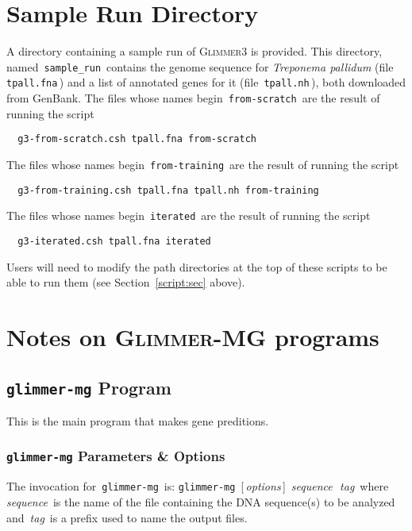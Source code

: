 \documentclass[fleqn,titlepage,11pt]{article}
\def\Desc#1{\,\mbox{\emph{#1}}\,}
\def\Gthree{\textsc{Glimmer3}}
\def\Gmg{\textsc{Glimmer-MG}}
\def\Pg#1{\texttt{#1}}
\begin{document}
\section{Sample Run Directory}

A directory containing a sample run of \Gthree{} is provided.
This directory, named \,\Pg{sample\_run}\, contains the genome sequence
for \emph{Treponema pallidum} (file \,\Pg{tpall.fna}\,)
and a list of annotated genes for it (file \,\Pg{tpall.nh}\,),
both downloaded from GenBank.
The files whose names begin \,\Pg{from-scratch}\, are the result of
running the script
\BSV
\begin{verbatim}
  g3-from-scratch.csh tpall.fna from-scratch
\end{verbatim}
\ESV
The files whose names begin \,\Pg{from-training}\, are the result of
running the script
\BSV
\begin{verbatim}
  g3-from-training.csh tpall.fna tpall.nh from-training
\end{verbatim}
\ESV
The files whose names begin \,\Pg{iterated}\, are the result of
running the script
\BSV
\begin{verbatim}
  g3-iterated.csh tpall.fna iterated
\end{verbatim}
\ESV
Users will need to modify the path directories at the top of these
scripts to be able to run them (see Section~\ref{script:sec} above).

\section{Notes on \Gmg{} programs}
\subsection{\Pg{glimmer-mg} Program}

This is the main program that makes gene preditions.

\subsubsection{\Pg{glimmer-mg} Parameters \& Options}
The invocation for \,\Pg{glimmer-mg}\, is:
\bq
  \Pg{glimmer-mg}\, [\Desc{options}] \Desc{sequence} \Desc{tag}
\eq
where \Desc{sequence} is the name of the file containing the DNA
sequence(s) to be analyzed and \Desc{tag} is a prefix used to name the
output files.
\end{document}
